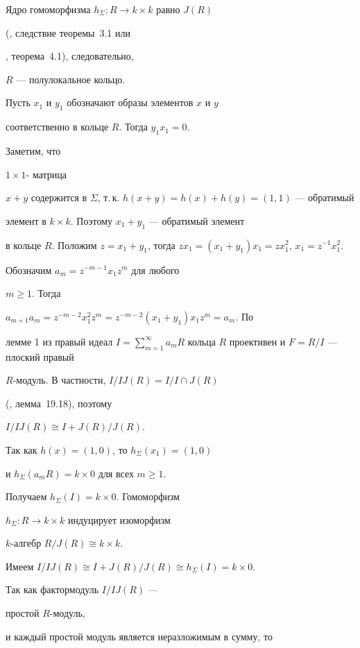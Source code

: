 Ядро гомоморфизма $h_\Sigma\colon R\to k\times k$ равно $J(R)$


(\cite{Cohn7}, следствие теоремы~3.1 или


\cite{dolors1}, теорема~4.1), следовательно,


$R$ --- полулокальное кольцо. 


Пусть $x_1$ и $y_1$ обозначают образы элементов $x$ и $y$ 


соответственно в кольце $R$. Тогда $y_{1}x_{1}=0$. 


Заметим, что 


$1\times 1$- матрица 


$x+y$ содержится в $\Sigma$, т.\,к. $h(x+y)=h(x)+h(y)=(1,1)$ --- обратимый 


элемент в $k\times k$. Поэтому $x_1+y_1$ --- обратимый элемент 


в кольце $R$. Положим $z=x_1+y_1$, тогда $zx_{1}=(x_{1}+y_{1})x_{1}


=zx_{1}^{2}$, $x_{1}= z^{-1}x_{1}^{2}$.


Обозначим $a_m=z^{-m-1}x_1z^m$ для любого


$m\ge 1$. Тогда 


$a_{m+1}a_m={z^{-m-2}x_1^2z^m}={z^{-m-2}(x_1+y_1)x_1z^m}= a_m$. По


лемме 1 из \cite{Sakh96} правый идеал $I=\sum_{m=1}^\infty


a_mR$ кольца $R$ проективен и $F=R/I$ --- плоский правый 


$R$-модуль. В частности, $I/IJ(R)=I/I\cap J(R)$ 


(\cite{AF2}, лемма~19.18), поэтому 


$I/IJ(R)\cong I+J(R)/J(R)$. 


Так как $h(x)=(1,0)$, то $h_\Sigma(x_1)=(1,0)$ 


и $h_\Sigma(a_mR)=k\times 0$ для всех $m\ge 1$. 


Получаем $h_\Sigma(I)=k\times 0$. Гомоморфизм 


$h_\Sigma\colon R\to k\times k$ индуцирует изоморфизм


$k$-алгебр $R/J(R) \cong k\times k$. 


Имеем $I/IJ(R)\cong I+J(R)/J(R)\cong


h_\Sigma(I)=k\times 0$.





Так как фактормодуль $I/IJ(R)$ --- 


простой $R$-модуль, 


и каждый простой модуль является неразложимым в сумму, то 


